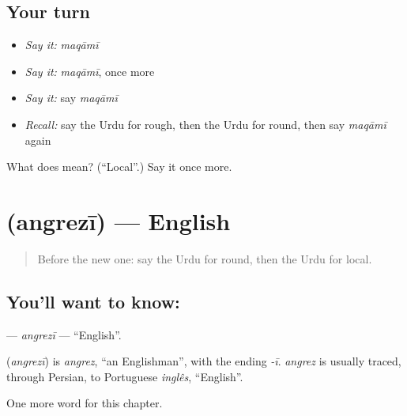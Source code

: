 \subsection*{Your turn}
\begin{itemize}
\raggedright
  \item \emph{Say it:} \emph{maqāmī}
  \item \emph{Say it:} \emph{maqāmī}, once more
  \item \emph{Say it:} say \emph{maqāmī}
  \item \emph{Recall:} say the Urdu for rough, then the Urdu for round, then say \emph{maqāmī} again
\end{itemize}

\begin{tcolorbox}[breakable,colback=teal!4,colframe=teal!35!black,title={Before you move on}]
What does  mean? (\textquotedblleft{}Local\textquotedblright{}.) Say it once more.
\end{tcolorbox}
\section[\texorpdfstring{\ur{انگریزی} (angrezī)}{انگریزی (angrezī)}]{ (angrezī) — English}

\label{lesson:UR-C162-angrezi}



\begin{quote}
Before the new one: say the Urdu for round, then the Urdu for local.
\end{quote}

\subsection*{You'll want to know: }
\textbf{} — \emph{angrezī} — \textquotedblleft{}English\textquotedblright{}.

\begin{cousinweb}
\textbf{} (\emph{angrezī}) is \emph{angrez}, \textquotedblleft{}an Englishman\textquotedblright{}, with the ending \emph{-ī}. \emph{angrez} is usually traced, through Persian, to Portuguese \emph{inglês}, \textquotedblleft{}English\textquotedblright{}.
\end{cousinweb}

\begin{grammarlens}[title={What you've built}]
One more word for this chapter.
\end{grammarlens}


